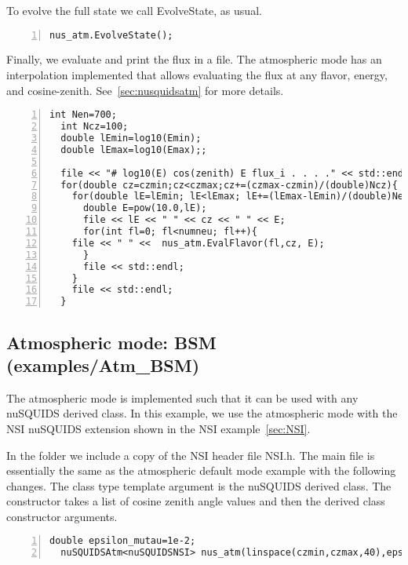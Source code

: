 \documentclass[3p,12pt]{elsarticle}
\newcommand{\ttf}{\ttfamily}
\begin{document}
To evolve the full state we call {\ttf EvolveState}, as usual. 

\begin{lstlisting}[frame=leftline, numbers =
  left,breaklines=true,label = ex:sin1,firstnumber=last]
nus_atm.EvolveState();
\end{lstlisting}

Finally, we evaluate and print the flux in a file. The
atmospheric mode has an interpolation implemented that allows
evaluating the flux at any flavor, energy, and cosine-zenith. See~\ref{sec:nusquidsatm}
for more details.

\begin{lstlisting}[frame=leftline, numbers =
  left,breaklines=true,label = ex:sin1,firstnumber=last]
  int Nen=700;
  int Ncz=100;
  double lEmin=log10(Emin);
  double lEmax=log10(Emax);;

  file << "# log10(E) cos(zenith) E flux_i . . . ." << std::endl;
  for(double cz=czmin;cz<czmax;cz+=(czmax-czmin)/(double)Ncz){
    for(double lE=lEmin; lE<lEmax; lE+=(lEmax-lEmin)/(double)Nen){
      double E=pow(10.0,lE);
      file << lE << " " << cz << " " << E;
      for(int fl=0; fl<numneu; fl++){
	file << " " <<  nus_atm.EvalFlavor(fl,cz, E);
      }
      file << std::endl;
    }
    file << std::endl;
  }
\end{lstlisting}


\subsection{Atmospheric mode: BSM \textnormal{({\ttf examples/Atm\_BSM})}}
\label{sec:atmBSM}
The atmospheric mode is implemented such  that it can be used with any
{\ttf nuSQUIDS} derived class. In this example, we use the atmospheric mode
with the NSI {\ttf nuSQUIDS} extension shown in the NSI example~\ref{sec:NSI}.

In the folder we include a copy of the NSI header file {\ttf NSI.h}.
The main file is essentially the same as the atmospheric default mode
example with the following changes.
The class type template argument is the {\ttf nuSQUIDS} derived class. The
constructor takes a list of cosine zenith angle values and then the
derived class constructor arguments. 

\begin{lstlisting}[frame=leftline, numbers =
  left,breaklines=true,label = ex:sin1,firstnumber=last]
  double epsilon_mutau=1e-2;
  nuSQUIDSAtm<nuSQUIDSNSI> nus_atm(linspace(czmin,czmax,40),epsilon_mutau,logspace(Emin,Emax,100),numneu,both,true);
\end{lstlisting}
\end{document}
